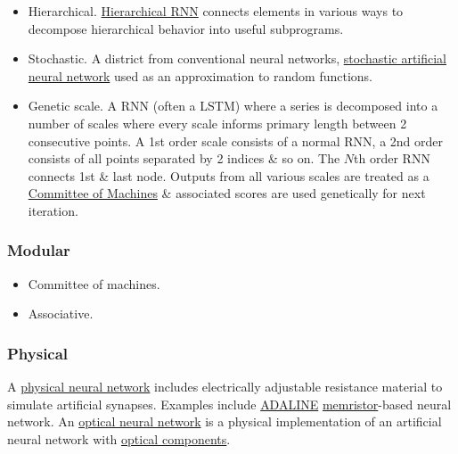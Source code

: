 \documentclass{article}
\begin{document}
\begin{itemize}
	\item {\sf Hierarchical.} \href{https://en.wikipedia.org/wiki/Recurrent_neural_network#Hierarchical_recurrent_neural_network}{Hierarchical RNN} connects elements in various ways to decompose hierarchical behavior into useful subprograms.
	\item {\sf Stochastic.} A district from conventional neural networks, \href{https://en.wikipedia.org/wiki/Artificial_neural_network#Stochastic_neural_network}{stochastic artificial neural network} used as an approximation to random functions.
	\item {\sf Genetic scale.} A RNN (often a LSTM) where a series is decomposed into a number of scales where every scale informs primary length between 2 consecutive points. A 1st order scale consists of a normal RNN, a 2nd order consists of all points separated by 2 indices \& so on. The $N$th order RNN connects 1st \& last node. Outputs from all various scales are treated as a \href{https://en.wikipedia.org/wiki/Committee_machine}{Committee of Machines} \& associated scores are used genetically for next iteration.
\end{itemize}

\subsubsection{Modular}

\begin{itemize}
	\item {\sf Committee of machines.}
	\item {\sf Associative.}
\end{itemize}

\subsubsection{Physical}
A \href{https://en.wikipedia.org/wiki/Physical_neural_network}{physical neural network} includes electrically adjustable resistance material to simulate artificial synapses. Examples include \href{https://en.wikipedia.org/wiki/ADALINE}{ADALINE} \href{https://en.wikipedia.org/wiki/Memristor}{memristor}-based neural network. An \href{https://en.wikipedia.org/wiki/Optical_neural_network}{optical neural network} is a physical implementation of an artificial neural network with \href{https://en.wikipedia.org/wiki/Photonics}{optical components}.
\end{document}
